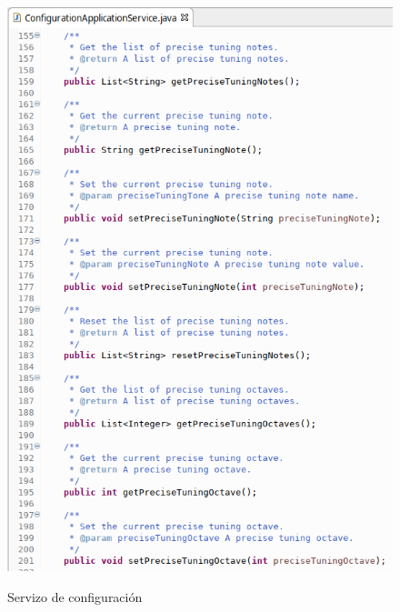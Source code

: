    \begin{figure}[htbp]
    \centering
    \includegraphics[scale=0.6, keepaspectratio=true]{./imagenes/servizo-configuracion-4.png} \\
    \caption{Servizo de configuración}
    \label{figura:ServizoConfiguracion4}
   \end{figure}
   

